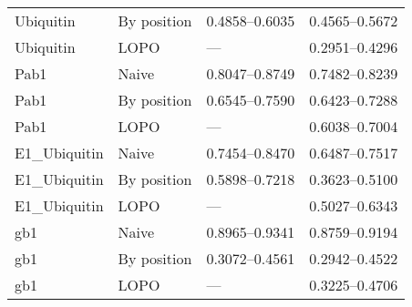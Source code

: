 \documentclass[10pt, british, luatex]{beamer}
\begin{document}
\begin{frame}
\begin{tabular*}{\linewidth}{@{\extracolsep{\fill}}llll}
		Ubiquitin      & By position & \numrange{0.4858}{0.6035}        & \numrange{0.4565}{0.5672}         \\
		Ubiquitin      & LOPO        & ---                              & \numrange{0.2951}{0.4296}         \\
		Pab1           & Naive       & \numrange{0.8047}{0.8749}        & \numrange{0.7482}{0.8239}         \\
		Pab1           & By position & \numrange{0.6545}{0.7590}        & \numrange{0.6423}{0.7288}         \\
		Pab1           & LOPO        & ---                              & \numrange{0.6038}{0.7004}         \\
		E1\_Ubiquitin  & Naive       & \numrange{0.7454}{0.8470}        & \numrange{0.6487}{0.7517}         \\
		E1\_Ubiquitin  & By position & \numrange{0.5898}{0.7218}        & \numrange{0.3623}{0.5100}         \\
		E1\_Ubiquitin  & LOPO        & ---                              & \numrange{0.5027}{0.6343}         \\
		gb1            & Naive       & \numrange{0.8965}{0.9341}        & \numrange{0.8759}{0.9194}         \\
		gb1            & By position & \numrange{0.3072}{0.4561}        & \numrange{0.2942}{0.4522}         \\
		gb1            & LOPO        & ---                              & \numrange{0.3225}{0.4706}         \\
		\bottomrule
	\end{tabular*}%
\end{frame}
\end{document}
